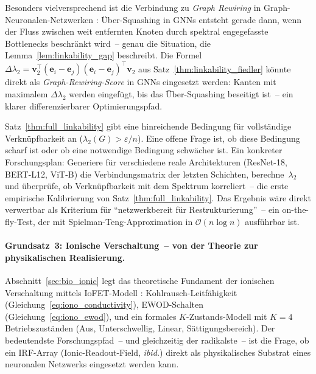 ﻿\documentclass[12pt, a4paper, openany]{report}
\begin{document}
Besonders vielversprechend ist die Verbindung zu \emph{Graph Rewiring} in
Graph-Neuronalen-Netzwerken \cite{topping22}: Über-Squashing in GNNs entsteht
gerade dann, wenn der Fluss zwischen weit entfernten Knoten durch spektral
engegefasste Bottlenecks beschränkt wird~-- genau die Situation, die
Lemma~\ref{lem:linkability_gap} beschreibt.  Die Formel
$\Delta\lambda_2 = \bm{v}_2^\top (\bm{e}_i - \bm{e}_j)(\bm{e}_i - \bm{e}_j)^\top \bm{v}_2$
aus Satz~\ref{thm:linkability_fiedler} könnte direkt als \emph{Graph-Rewiring-Score}
in GNNs eingesetzt werden: Kanten mit maximalem $\Delta\lambda_2$ werden
eingefügt, bis das Über-Squashing beseitigt ist~-- ein klarer differenzierbarer
Optimierungspfad.

Satz~\ref{thm:full_linkability} gibt eine hinreichende Bedingung für
vollständige Verknüpfbarkeit an ($\lambda_2(G) > \varepsilon / n$).  Eine
offene Frage ist, ob diese Bedingung scharf ist oder ob eine notwendige
Bedingung schwächer ist.  Ein konkreter Forschungsplan: Generiere für
verschiedene reale Architekturen (ResNet-18, BERT-L12, ViT-B) die
Verbindungsmatrix der letzten Schichten, berechne~$\lambda_2$ und überprüfe,
ob Verknüpfbarkeit mit dem Spektrum korreliert~-- die erste empirische
Kalibrierung von Satz~\ref{thm:full_linkability}.  Das Ergebnis wäre direkt
verwertbar als Kriterium für ``netzwerkbereit für Restrukturierung''~-- ein
on-the-fly-Test, der mit Spielman-Teng-Approximation
\cite{spielman11} in $\mathcal{O}(n \log n)$ ausführbar ist.

\paragraph{Grundsatz~3: Ionische Verschaltung~-- von der Theorie zur
  physikalischen Realisierung.}
Abschnitt~\ref{sec:bio_ionic} legt das theoretische Fundament der ionischen
Verschaltung mittels IoFET-Modell \cite{epp2026iono}: Kohlrausch-Leitfähigkeit
(Gleichung~\ref{eq:iono_conductivity}), EWOD-Schalten
(Gleichung~\ref{eq:iono_ewod}), und ein formales $K$-Zu\-stands-Modell mit
$K=4$ Betriebszuständen (Aus, Unterschwellig, Linear, Sättigungsbereich).
Der bedeutendste Forschungspfad~-- und gleichzeitig der radikalste~-- ist die
Frage, ob ein IRF-Array (Ionic-Readout-Field, \textit{ibid.}) direkt als
physikalisches Substrat eines neuronalen Netzwerks eingesetzt werden kann.
\end{document}
